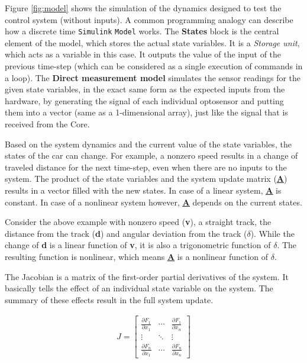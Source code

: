 Figure \ref{fig:model} shows the simulation of the dynamics designed to test the control system (without inputs). A common programming analogy can describe how a discrete time \verb!Simulink! \verb!Model! works. The \textbf{States} block is the central element of the model, which stores the actual state variables. It is a \emph{Storage unit}, which acts as a variable in this case. It outputs the value of the input of the previous time-step (which can be considered as a single execution of commands in a loop). The \textbf{Direct measurement model} simulates the sensor readings for the given state variables, in the exact same form as the expected inputs from the hardware, by generating the signal of each individual optosensor and putting them into a vector (same as a 1-dimensional array), just like the signal that is received from the Core.

Based on the system dynamics and the current value of the state variables, the states of the car can change. For example, a nonzero speed results in a change of traveled distance for the next time-step, even when there are no inputs to the system. The product of the state variables and the system update matrix (\textbf{\underline{\underline{A}}}) results in a vector filled with the new states. In case of a linear system, \textbf{\underline{\underline{A}}} is constant. In case of a nonlinear system however, \textbf{\underline{\underline{A}}} depends on the current states. 

Consider the above example with nonzero speed (\textbf{v}), a straight track, the distance from the track (\textbf{d}) and angular deviation from the track ($\delta$). While the change of \textbf{d} is a linear function of \textbf{v}, it is also a trigonometric function of $\delta$. The resulting function is nonlinear, which means \textbf{\underline{\underline{A}}} is a nonlinear function of $\delta$. 

The Jacobian is a matrix of the first-order partial derivatives of the system\cite[p. 294]{jacobian}. It basically tells the effect of an individual state variable on the system. The summary of these effects result in the full system update.

\begin{align}
J =
 \begin{bmatrix}
  \frac{\partial F_1}{\partial x_1} & \cdots & \frac{\partial F_1}{\partial x_n} \\
  \vdots  & \ddots & \vdots  \\
  \frac{\partial F_n}{\partial x_1} & \cdots & \frac{\partial F_n}{\partial x_n}
 \end{bmatrix}
\end{align}

